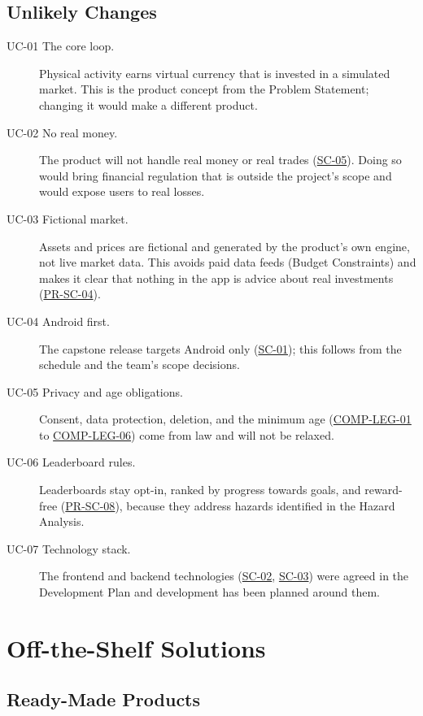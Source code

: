 \documentclass[12pt]{article}
\begin{document}
\subsection{Unlikely Changes}

\begin{description}
  \item[UC-01 The core loop.] Physical activity earns virtual currency that is
  invested in a simulated market. This is the product concept from the Problem
  Statement; changing it would make a different product.
  \item[UC-02 No real money.] The product will not handle real money or real
  trades (\hyperlink{req:SC-05}{SC-05}). Doing so would bring financial regulation that is outside the
  project's scope and would expose users to real losses.
  \item[UC-03 Fictional market.] Assets and prices are fictional and generated
  by the product's own engine, not live market data. This avoids paid data
  feeds (Budget Constraints) and makes it clear that nothing in the app is
  advice about real investments (\hyperlink{req:PR-SC-04}{PR-SC-04}).
  \item[UC-04 Android first.] The capstone release targets Android only
  (\hyperlink{req:SC-01}{SC-01}); this follows from the schedule and the team's scope decisions.
  \item[UC-05 Privacy and age obligations.] Consent, data protection, deletion,
  and the minimum age (\hyperlink{req:COMP-LEG-01}{COMP-LEG-01} to \hyperlink{req:COMP-LEG-06}{COMP-LEG-06}) come from law and will not be
  relaxed.
  \item[UC-06 Leaderboard rules.] Leaderboards stay opt-in, ranked by progress
  towards goals, and reward-free (\hyperlink{req:PR-SC-08}{PR-SC-08}), because they address hazards
  identified in the Hazard Analysis.
  \item[UC-07 Technology stack.] The frontend and backend technologies
  (\hyperlink{req:SC-02}{SC-02}, \hyperlink{req:SC-03}{SC-03}) were agreed in the Development Plan and development has been
  planned around them.
\end{description}

\section{Off-the-Shelf Solutions}
\subsection{Ready-Made Products}
\end{document}
